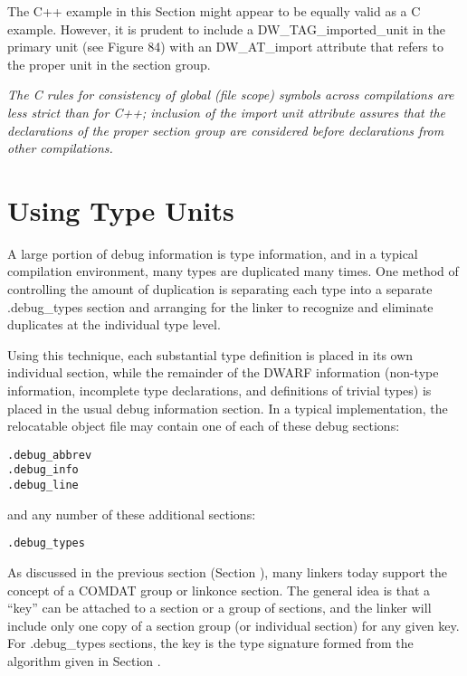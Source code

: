 The C++ example in this Section might appear to be equally
valid as a C example. However, it is prudent to include
a DW\_TAG\_imported\_unit in the primary unit (see Figure 84)
with an DW\_AT\_import attribute that refers to the proper unit
in the section group.

\textit{The C rules for consistency of global (file scope) symbols
across compilations are less strict than for C++; inclusion
of the import unit attribute assures that the declarations of
the proper section group are considered before declarations
from other compilations.}


\section{Using Type Units}
\label{app:usingtypeunits}

A large portion of debug information is type information, and
in a typical compilation environment, many types are duplicated
many times. One method of controlling the amount of duplication
is separating each type into a separate .debug\_types section
and arranging for the linker to recognize and eliminate
duplicates at the individual type level.

Using this technique, each substantial type definition is
placed in its own individual section, while the remainder
of the DWARF information (non-type information, incomplete
type declarations, and definitions of trivial types) is
placed in the usual debug information section. In a typical
implementation, the relocatable object file may contain one
of each of these debug sections:

\begin{alltt}
.debug\_abbrev
.debug\_info
.debug\_line
\end{alltt}

and any number of these additional sections:

\begin{alltt}
.debug\_types
\end{alltt}

As discussed in the previous section 
(Section ), 
many
linkers today support the concept of a COMDAT group or
linkonce section. The general idea is that a ``key'' can be
attached to a section or a group of sections, and the linker
will include only one copy of a section group (or individual
section) for any given key. For .debug\_types sections, the
key is the type signature formed from the algorithm given in
Section .


